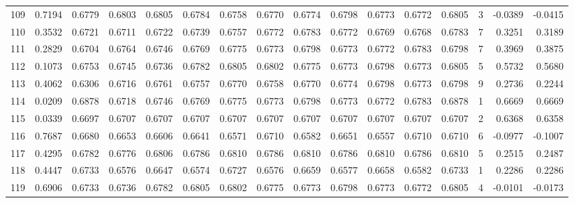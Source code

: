 \begin{tabular}{lrrrrrrrrrrrrrrr}
109 &      0.7194 &  0.6779 &  0.6803 &  0.6805 &  0.6784 &  0.6758 &  0.6770 &  0.6774 &  0.6798 &  0.6773 &   0.6772 &     0.6805 &      3 &                   -0.0389 &                    -0.0415 \\
110 &      0.3532 &  0.6721 &  0.6711 &  0.6722 &  0.6739 &  0.6757 &  0.6772 &  0.6783 &  0.6772 &  0.6769 &   0.6768 &     0.6783 &      7 &                    0.3251 &                     0.3189 \\
111 &      0.2829 &  0.6704 &  0.6764 &  0.6746 &  0.6769 &  0.6775 &  0.6773 &  0.6798 &  0.6773 &  0.6772 &   0.6783 &     0.6798 &      7 &                    0.3969 &                     0.3875 \\
112 &      0.1073 &  0.6753 &  0.6745 &  0.6736 &  0.6782 &  0.6805 &  0.6802 &  0.6775 &  0.6773 &  0.6798 &   0.6773 &     0.6805 &      5 &                    0.5732 &                     0.5680 \\
113 &      0.4062 &  0.6306 &  0.6716 &  0.6761 &  0.6757 &  0.6770 &  0.6758 &  0.6770 &  0.6774 &  0.6798 &   0.6773 &     0.6798 &      9 &                    0.2736 &                     0.2244 \\
114 &      0.0209 &  0.6878 &  0.6718 &  0.6746 &  0.6769 &  0.6775 &  0.6773 &  0.6798 &  0.6773 &  0.6772 &   0.6783 &     0.6878 &      1 &                    0.6669 &                     0.6669 \\
115 &      0.0339 &  0.6697 &  0.6707 &  0.6707 &  0.6707 &  0.6707 &  0.6707 &  0.6707 &  0.6707 &  0.6707 &   0.6707 &     0.6707 &      2 &                    0.6368 &                     0.6358 \\
116 &      0.7687 &  0.6680 &  0.6653 &  0.6606 &  0.6641 &  0.6571 &  0.6710 &  0.6582 &  0.6651 &  0.6557 &   0.6710 &     0.6710 &      6 &                   -0.0977 &                    -0.1007 \\
117 &      0.4295 &  0.6782 &  0.6776 &  0.6806 &  0.6786 &  0.6810 &  0.6786 &  0.6810 &  0.6786 &  0.6810 &   0.6786 &     0.6810 &      5 &                    0.2515 &                     0.2487 \\
118 &      0.4447 &  0.6733 &  0.6576 &  0.6647 &  0.6574 &  0.6727 &  0.6576 &  0.6659 &  0.6577 &  0.6658 &   0.6582 &     0.6733 &      1 &                    0.2286 &                     0.2286 \\
119 &      0.6906 &  0.6733 &  0.6736 &  0.6782 &  0.6805 &  0.6802 &  0.6775 &  0.6773 &  0.6798 &  0.6773 &   0.6772 &     0.6805 &      4 &                   -0.0101 &                    -0.0173 \\

\end{tabular}
